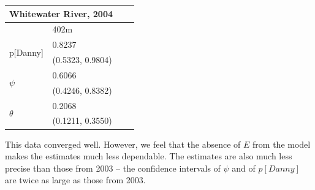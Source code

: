 \documentclass[12pt]{article}
\begin{document}
    \begin{center}
    \begin{tabular}{|l|l|l|l|}
        \hline
        \multicolumn{2}{|l|}{\textbf{Whitewater River, 2004}} \\
        \hline
            & 402m \\
        \hline
        \multirow{2}{*}{p[Danny]}
            & 0.8237 \\
            & (0.5323, 0.9804) \\
        \hline
        \multirow{2}{*}{\(\psi\)}
            & 0.6066 \\
            & (0.4246, 0.8382) \\
        \hline
        \multirow{2}{*}{\(\theta\)}
            & 0.2068 \\
            & (0.1211, 0.3550) \\
        \hline
    \end{tabular}
    \end{center}

    This data converged well. However, we feel that the absence of \(E\) from
    the model makes the estimates much less dependable. The estimates are also
    much less precise than those from 2003 -- the confidence intervals of
    \(\psi\) and of \(p[Danny]\) are twice as large as those from 2003.
\end{document}
